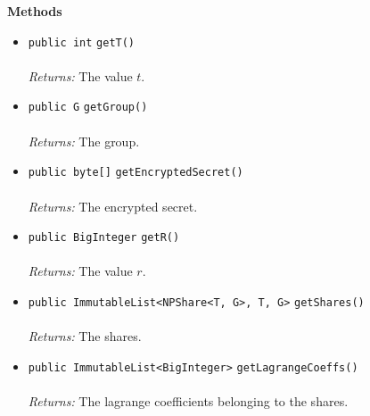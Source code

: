 \textbf{\sffamily Methods}
\begin{itemize}
\item \lstinline|public int| \lstinline|getT|\lstinline|()|\\ \\[-0.6em]
\emph{Returns:} The value $t$.



\item \lstinline|public G| \lstinline|getGroup|\lstinline|()|\\ \\[-0.6em]
\emph{Returns:} The group.



\item \lstinline|public byte[]| \lstinline|getEncryptedSecret|\lstinline|()|\\ \\[-0.6em]
\emph{Returns:} The encrypted secret.



\item \lstinline|public BigInteger| \lstinline|getR|\lstinline|()|\\ \\[-0.6em]
\emph{Returns:} The value $r$.



\item \lstinline|public ImmutableList<NPShare<T, G>, T, G>| \lstinline|getShares|\lstinline|()|\\ \\[-0.6em]
\emph{Returns:} The shares.



\item \lstinline|public ImmutableList<BigInteger>| \lstinline|getLagrangeCoeffs|\lstinline|()|\\ \\[-0.6em]
\emph{Returns:} The lagrange coefficients belonging to the shares.



\end{itemize}

